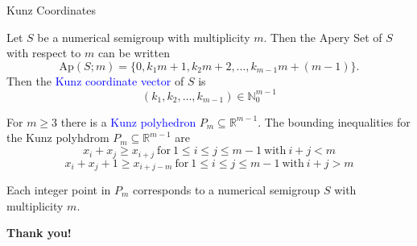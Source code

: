 \documentclass[10pt]{beamer}
\newcommand{\blue}[1]{\textcolor{blue}{#1}}
\newcommand{\N}{\mathbb{N}_0}
\newcommand{\R}{\mathbb{R}}
\begin{document}
\begin{frame}{Kunz Coordinates}

\begin{block}{}
    Let $S$ be a numerical semigroup with multiplicity $m$. Then the Apery Set of $S$ with respect to $m$ can be written  
    $$\text{Ap} (S ; m) = \{ 0, k_1m + 1, k_2 m + 2, \dots, k_{m-1}m + (m - 1) \}.$$ 
    Then the \blue{Kunz coordinate vector} of $S$ is $$(k_1, k_2, \dots, k_{m -1 }) \in \N^{m-1}$$
\end{block}

\begin{block}{}
    For $m \geq 3$ there is a \blue{Kunz polyhedron} $P_m \subseteq \R^{m-1}$. The bounding inequalities for the Kunz polyhdrom $P_m \subseteq \R^{m-1}$ are 
$$x_i + x_j \geq x_{i+j} \ \text{for} \ 1 \leq i \leq j \leq m - 1 \ \text{with} \ i + j < m$$
$$x_i + x_j + 1 \geq x_{i+j-m} \ \text{for} \ 1 \leq i \leq j \leq m - 1 \ \text{with} \ i + j > m$$
\end{block}

Each integer point in $P_m$ corresponds to a numerical semigroup $S$ with multiplicity $m$. 
\end{frame}
\begin{frame}{}
    
\end{frame}

\begin{frame}
    \begin{center} 
        \textbf{\Huge Thank you!}\\
        \vfill
    \end{center}
\end{frame}
\end{document}
